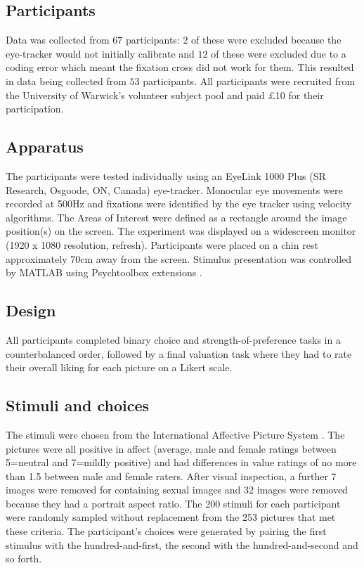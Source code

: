 \documentclass[12pt]{article}
\begin{document}
\subsection{Participants}

Data was collected from $67$ participants: $2$ of these were excluded because the eye-tracker would not initially calibrate and $12$ of these were excluded due to a coding error which meant the fixation cross did not work for them. This resulted in data being collected from $53$ participants. All participants were recruited from the University of Warwick’s volunteer subject pool and paid £10 for their participation.

\subsection{Apparatus}
The participants were tested individually using an EyeLink 1000 Plus (SR Research, Osgoode, ON, Canada) eye-tracker. Monocular eye movements were recorded at 500Hz and fixations were identified by the eye tracker using velocity algorithms. The Areas of Interest were defined as a rectangle around the image position(s) on the screen. The experiment was displayed on a widescreen monitor (1920 x 1080 resolution, refresh). Participants were placed on a chin rest approximately 70cm away from the screen. Stimulus presentation was controlled by MATLAB using Psychtoolbox extensions \cite{Brainard1997, Pelli1997}.

\subsection{Design}
All participants completed binary choice and strength-of-preference tasks in a counterbalanced order, followed by a final valuation task where they had to rate their overall liking for each picture on a Likert scale. 

\subsection{Stimuli and choices}
The stimuli were chosen from the International Affective Picture System \cite{Lang:2008}. The pictures were all positive in affect (average, male and female ratings between 5=neutral and 7=mildly positive) and had differences in value ratings of no more than 1.5 between male and female raters. After visual inspection, a further 7 images were removed for containing sexual images and 32 images were removed because they had a portrait aspect ratio. The 200 stimuli for each participant were randomly sampled without replacement from the 253 pictures that met these criteria. The participant's choices were generated by pairing the first stimulus with the hundred-and-first, the second with the hundred-and-second and so forth. 
\end{document}
